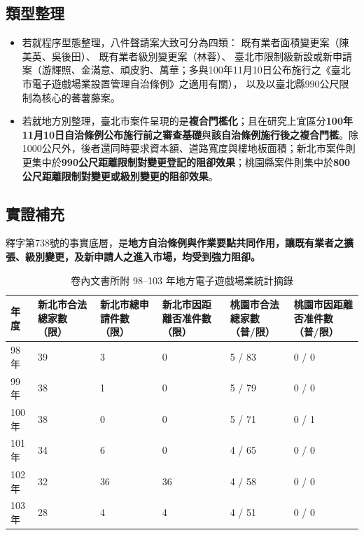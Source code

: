 
\subsection{類型整理}

\begin{itemize}
  \item 若就程序型態整理，八件聲請案大致可分為四類：
  既有業者面積變更案（陳美英、吳後田）、
  既有業者級別變更案（林蓉）、
  臺北市限制級新設或新申請案（游輝照、金滿意、頑皮豹、萬華；多與100年11月10日公布施行之《臺北市電子遊戲場業設置管理自治條例》之適用有關），
  以及以臺北縣990公尺限制為核心的蕃薯藤案。
  \item 若就地方別整理，臺北市案件呈現的是\textbf{複合門檻化}；且在研究上宜區分\textbf{100年11月10日自治條例公布施行前之審查基礎}與\textbf{該自治條例施行後之複合門檻}。除1000公尺外，後者還同時要求資本額、道路寬度與樓地板面積；新北市案件則更集中於\textbf{990公尺距離限制對變更登記的阻卻效果}；桃園縣案件則集中於\textbf{800公尺距離限制對變更或級別變更的阻卻效果}。
\end{itemize}

\subsection{實證補充}


釋字第738號的事實底層，是\textbf{地方自治條例與作業要點共同作用，讓既有業者之擴張、級別變更，及新申請人之進入市場，均受到強力阻卻。}

\begin{table}[H]
\centering
\footnotesize
\setlength{\tabcolsep}{3pt}
\caption{卷內文書所附 98--103 年地方電子遊戲場業統計摘錄}
\begin{tabularx}{0.96\textwidth}{L{1cm}L{2cm}L{2cm}L{2.1cm}L{2.2cm}Y}
\toprule
年度 & 新北市合法總家數（限） & 新北市總申請件數（限） & 新北市因距離否准件數（限） & 桃園市合法總家數（普/限） & 桃園市因距離否准件數（普/限） \\
\midrule
98年 & 39 & 3 & 0 & 5 / 83 & 0 / 0 \\
\midrule
99年 & 38 & 1 & 0 & 5 / 79 & 0 / 0 \\
\midrule
100年 & 38 & 0 & 0 & 5 / 71 & 0 / 1 \\
\midrule
101年 & 34 & 6 & 0 & 4 / 65 & 0 / 0 \\
\midrule
102年 & 32 & 36 & 36 & 4 / 58 & 0 / 0 \\
\midrule
103年 & 28 & 4 & 4 & 4 / 51 & 0 / 0 \\
\bottomrule
\end{tabularx}
\end{table}

